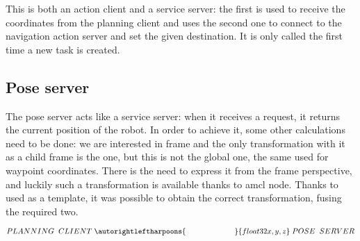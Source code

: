 This is both an action client and a service server: the first is used to receive the coordinates from the planning client and  uses the second one to connect to the navigation action server and set the given destination. It is only called the first time a new task is created.

\subsection{Pose server} %
\label{sub:pose}

The pose server acts like a service server: when it receives a request, it returns the current position of the robot. In order to achieve it, some other calculations need to be done: we are interested in  frame and the only transformation with it as a child frame is the  one, but this is not the global one, the same used for waypoint coordinates. There is the need to express it from the  frame perspective, and luckily such a transformation is available thanks to \Acrshort{amcl} node. 
Thanks to \cite{tfexample} used as a template, it was possible to obtain the correct transformation, fusing the required two.

$$
    PLANNING \;\; CLIENT \; 
        \autorightleftharpoons{\;\;\;\;\;\;\;\;\;\;\;\;\;\;\;\;\;\;\;\;\;\;\;}{float32 x, y, z} \;
    POSE \;\; SERVER
$$ 





